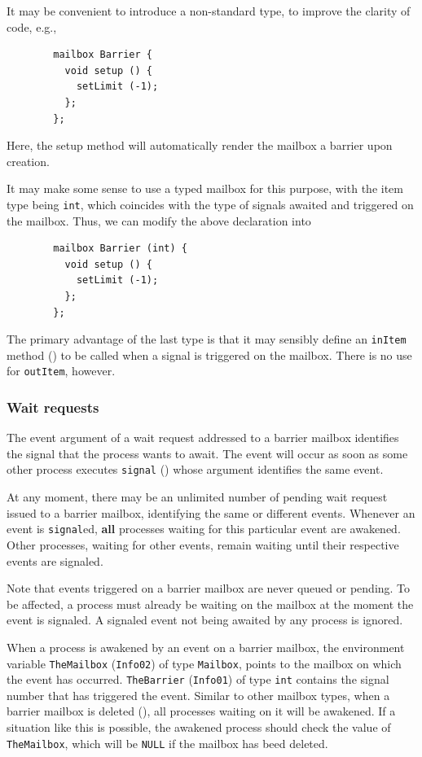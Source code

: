 It may be convenient to introduce a non-standard type, to improve the
clarity of code, e.g.,
\begin{verbatim}
        mailbox Barrier {
          void setup () {
            setLimit (-1);
          };
        };
\end{verbatim}
Here, the setup method will automatically render the mailbox a barrier upon
creation.

It may make some sense to use a typed mailbox for this purpose, with the
item type being {\tt int}, which coincides with the type of signals awaited
and triggered on the mailbox.
Thus, we can modify the above declaration into
\begin{verbatim}
        mailbox Barrier (int) {
          void setup () {
            setLimit (-1);
          };
        };
\end{verbatim}
The primary advantage of the last type is that it may sensibly define
an {\tt inItem} method () to be called when a signal
is triggered on the mailbox.
There is no use for {\tt outItem}, however.

\subsubsection{Wait requests}
\label{rm_mb_ba_wr}

The event argument of a wait request addressed to a barrier mailbox identifies
the signal that the process wants to await.
The event will occur as soon as some other process executes {\tt signal}
() whose argument identifies the same event.

At any moment, there may be an unlimited number of pending wait request
issued to a barrier mailbox, identifying the same or different events.
Whenever an event is {\tt signal}ed, {\bf all} processes waiting for this
particular event are awakened.
Other processes, waiting for other events, remain waiting until their
respective events are signaled.

Note that events triggered on a barrier mailbox are never queued or pending.
To be affected, a process must already be waiting on the mailbox at the moment
the event is signaled.
A signaled event not being awaited by any process is ignored.

When a process is awakened by an event on a barrier mailbox, the environment
variable {\tt TheMailbox} ({\tt Info02})
of type {\tt Mailbox}, points to the mailbox on which the event has occurred.
{\tt TheBarrier} ({\tt Info01}) of type {\tt int} contains the signal number
that has triggered the event.
Similar to other mailbox types, when a barrier mailbox is deleted
(), all processes waiting on it will be awakened.
If a situation like this is possible, the awakened
process should check the value of {\tt TheMailbox}, which will be {\tt NULL}
if the mailbox has beed deleted.

